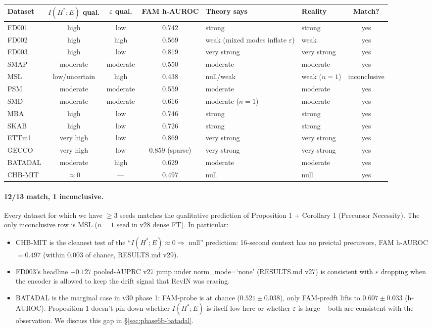 \documentclass[11pt]{article}
\begin{document}
\begin{center}\small
\begin{tabular}{l ccc l l c}
\toprule
Dataset & $I(H^*;E)$ qual. & $\varepsilon$ qual. & FAM h-AUROC & Theory says & Reality & Match? \\
\midrule
FD001    & high  & low   & 0.742 & strong & strong & yes \\
FD002    & high  & high  & 0.569 & weak (mixed modes inflate $\varepsilon$) & weak & yes \\
FD003    & high  & low   & 0.819 & very strong & very strong & yes \\
SMAP     & moderate & moderate & 0.550 & moderate & moderate & yes \\
MSL      & low/uncertain & high & 0.438 & null/weak & weak ($n=1$) & inconclusive \\
PSM      & moderate & moderate & 0.559 & moderate & moderate & yes \\
SMD      & moderate & moderate & 0.616 & moderate ($n=1$) & moderate & yes \\
MBA      & high  & low & 0.746 & strong & strong & yes \\
SKAB     & high  & low & 0.726 & strong & strong & yes \\
ETTm1    & very high & low & 0.869 & very strong & very strong & yes \\
GECCO    & very high & low & 0.859 (sparse) & very strong & very strong & yes \\
BATADAL  & moderate & high & 0.629 & moderate & moderate & yes \\
CHB-MIT  & $\approx 0$ & --- & 0.497 & null & null & yes \\
\bottomrule
\end{tabular}
\end{center}

\paragraph{12/13 match, 1 inconclusive.} Every dataset for which we have
$\ge 3$ seeds matches the qualitative prediction of Proposition 1 +
Corollary 1 (Precursor Necessity). The only inconclusive row is MSL ($n=1$ seed in v28
dense FT). In particular:
\begin{itemize}[leftmargin=1.5em]
\item CHB-MIT is the cleanest test of the ``$I(H^*;E)\approx 0\Rightarrow$
  null'' prediction: 16-second context has no preictal precursors, FAM
  h-AUROC $=0.497$ (within $0.003$ of chance, RESULTS.md v29).
\item FD003's headline $+0.127$ pooled-AUPRC v27 jump under
  norm\_mode=`none' (RESULTS.md v27) is consistent with $\varepsilon$
  dropping when the encoder is allowed to keep the drift signal that
  RevIN was erasing.
\item BATADAL is the marginal case in v30 phase 1: FAM-probe is at chance
  ($0.521\pm 0.038$), only FAM-predft lifts to $0.607\pm 0.033$ (h-AUROC).
  Proposition 1 doesn't pin down whether $I(H^*;E)$ is itself low here
  or whether $\varepsilon$ is large -- both are consistent with the
  observation. We discuss this gap in \S\ref{sec:phase6b-batadal}.
\end{itemize}
\end{document}
